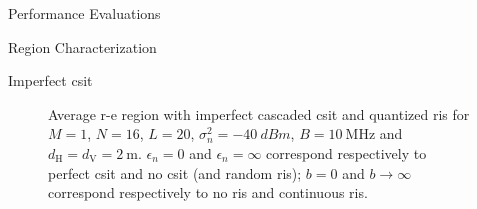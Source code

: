 \begin{section}{Performance Evaluations}
\begin{subsection}{ Region Characterization}
		\begin{subsubsection}{Imperfect \gls{csit}}
			\begin{figure}[H]
				\centering
				\caption{Average \gls{r-e} region with imperfect cascaded \gls{csit} and quantized \gls{ris} for $M=1$, $N=16$, $L=20$, $\sigma_n^2=\qty{-40}{dBm}$, $B=\qty{10}{\MHz}$ and $d_{\mathrm{H}}=d_{\mathrm{V}}=\qty{2}{\meter}$. $\epsilon_{n}=0$ and $\epsilon_{n}=\infty$ correspond respectively to perfect \gls{csit} and no \gls{csit} (and random \gls{ris}); $b=0$ and $b \to \infty$ correspond respectively to no \gls{ris} and continuous \gls{ris}.}
			\end{figure}


\end{subsubsection}
\end{subsection}
\end{section}
